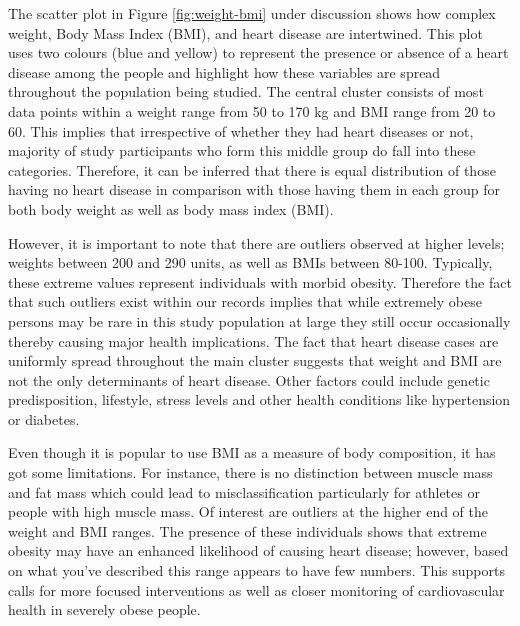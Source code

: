 \documentclass[12pt, a4paper,twoside]{report}
\numberwithin{equation}{chapter}
\begin{document}

The scatter plot in Figure \ref{fig:weight-bmi} under discussion shows how complex weight, Body Mass Index (BMI), and heart disease are intertwined. This plot uses two colours (blue and yellow) to represent the presence or absence of a heart disease among the people and highlight how these variables are spread throughout the population being studied.
The central cluster consists of most data points within a weight range from 50 to 170 kg and BMI range from 20 to 60. This implies that irrespective of whether they had heart diseases or not, majority of study participants who form this middle group do fall into these categories. Therefore, it can be inferred that there is equal distribution of those having no heart disease in comparison with those having them in each group for both body weight as well as body mass index (BMI).

However, it is important to note that there are outliers observed at higher levels; weights between 200 and 290 units, as well as BMIs between 80-100. Typically, these extreme values represent individuals with morbid obesity. Therefore the fact that such outliers exist within our records implies that while extremely obese persons may be rare in this study population at large they still occur occasionally thereby causing major health implications.
The fact that heart disease cases are uniformly spread throughout the main cluster suggests that weight and BMI are not the only determinants of heart disease. Other factors could include genetic predisposition, lifestyle, stress levels and other health conditions like hypertension or diabetes.

Even though it is popular to use BMI as a measure of body composition, it has got some limitations. For instance, there is no distinction between muscle mass and fat mass which could lead to misclassification particularly for athletes or people with high muscle mass.
Of interest are outliers at the higher end of the weight and BMI ranges. The presence of these individuals shows that extreme obesity may have an enhanced likelihood of causing heart disease; however, based on what you've described this range appears to have few numbers. This supports calls for more focused interventions as well as closer monitoring of cardiovascular health in severely obese people.
\end{document}
